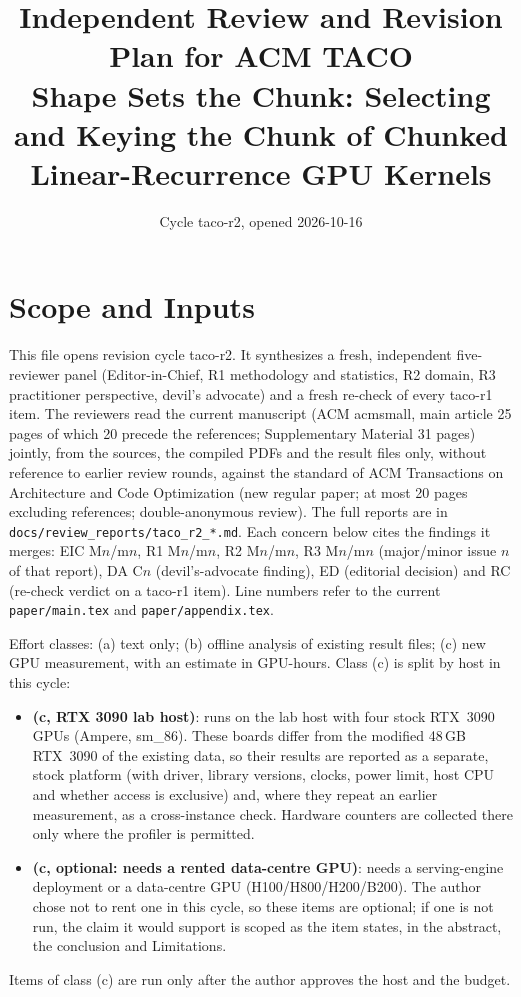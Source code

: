 \documentclass[11pt]{article}
\title{Independent Review and Revision Plan for ACM TACO\\
\large Shape Sets the Chunk: Selecting and Keying the Chunk of Chunked
Linear-Recurrence GPU Kernels}
\date{Cycle taco-r2, opened 2026-10-16}
\begin{document}
\maketitle
\sloppy

\section*{Scope and Inputs}

This file opens revision cycle taco-r2. It synthesizes a fresh, independent
five-reviewer panel (Editor-in-Chief, R1 methodology and statistics, R2
domain, R3 practitioner perspective, devil's advocate) and a fresh re-check of
every taco-r1 item. The reviewers read the current manuscript (ACM acmsmall,
main article 25 pages of which 20 precede the references; Supplementary
Material 31 pages) jointly, from the sources, the compiled PDFs and the result
files only, without reference to earlier review rounds, against the standard
of ACM Transactions on Architecture and Code Optimization (new regular paper;
at most 20 pages excluding references; double-anonymous review). The full
reports are in \texttt{docs/review\_reports/taco\_r2\_*.md}. Each concern below
cites the findings it merges: EIC M$n$/m$n$, R1 M$n$/m$n$, R2 M$n$/m$n$, R3
M$n$/m$n$ (major/minor issue $n$ of that report), DA C$n$ (devil's-advocate
finding), ED (editorial decision) and RC (re-check verdict on a taco-r1 item).
Line numbers refer to the current \texttt{paper/main.tex} and
\texttt{paper/appendix.tex}.

Effort classes: (a) text only; (b) offline analysis of existing result files;
(c) new GPU measurement, with an estimate in GPU-hours. Class (c) is split by
host in this cycle:
\begin{itemize}
  \item \textbf{(c, RTX 3090 lab host)}: runs on the lab host with four stock
        RTX~3090 GPUs (Ampere, sm\_86). These boards differ from the modified
        48\,GB RTX~3090 of the existing data, so their results are reported as
        a separate, stock platform (with driver, library versions, clocks,
        power limit, host CPU and whether access is exclusive) and, where they
        repeat an earlier measurement, as a cross-instance check. Hardware
        counters are collected there only where the profiler is permitted.
  \item \textbf{(c, optional: needs a rented data-centre GPU)}: needs a
        serving-engine deployment or a data-centre GPU (H100/H800/H200/B200).
        The author chose not to rent one in this cycle, so these items are
        optional; if one is not run, the claim it would support is scoped as
        the item states, in the abstract, the conclusion and Limitations.
\end{itemize}
Items of class (c) are run only after the author approves the host and the
budget.
\end{document}

